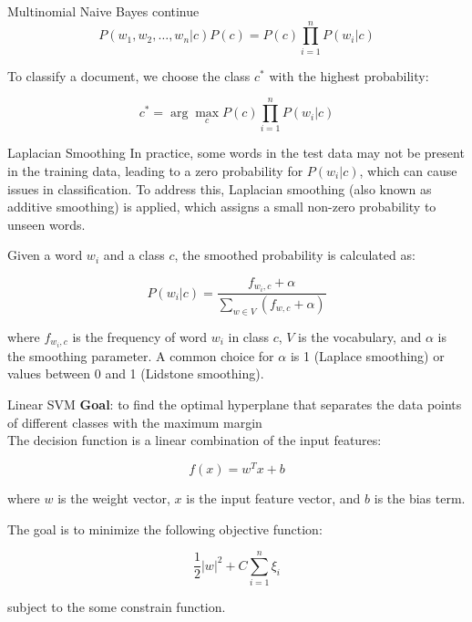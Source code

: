 \documentclass{beamer}
\begin{document}
\begin{frame}{Multinomial Naive Bayes continue}
\begin{equation}
P(w_1, w_2, \dots, w_n|c)P(c) = P(c)\prod_{i=1}^{n} P(w_i|c)
\end{equation}

To classify a document, we choose the class $c^*$ with the highest probability:

\begin{equation}
c^* = \arg\max_c P(c)\prod_{i=1}^{n} P(w_i|c)
\end{equation}
\end{frame}

\begin{frame}{Laplacian Smoothing}
    In practice, some words in the test data may not be present in the training data, leading to a zero probability for $P(w_i|c)$, which can cause issues in classification. To address this, Laplacian smoothing (also known as additive smoothing) is applied, which assigns a small non-zero probability to unseen words.

Given a word $w_i$ and a class $c$, the smoothed probability is calculated as:

\begin{equation}
P(w_i|c) = \frac{f_{w_i, c} + \alpha}{\sum_{w \in V} (f_{w, c} + \alpha)}
\end{equation}

where $f_{w_i, c}$ is the frequency of word $w_i$ in class $c$, $V$ is the vocabulary, and $\alpha$ is the smoothing parameter. A common choice for $\alpha$ is 1 (Laplace smoothing) or values between 0 and 1 (Lidstone smoothing).
\end{frame}
    

\begin{frame}{Linear SVM}
\textbf{Goal}: to find the optimal hyperplane that separates the data points of different classes with the maximum margin
\\
The decision function is a linear combination of the input features:

\begin{equation}
f(x) = w^T x + b
\end{equation}

where $w$ is the weight vector, $x$ is the input feature vector, and $b$ is the bias term.

The goal is to minimize the following objective function:

\begin{equation}
\frac{1}{2} |w|^2 + C \sum_{i=1}^{n} \xi_i
\end{equation}

subject to the some constrain function.
\end{frame}
\end{document}
